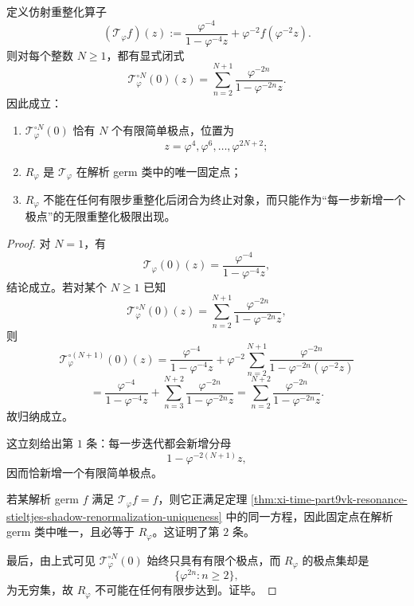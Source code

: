 \begin{corollary}[共振影子的有限步极点生成律]\label{cor:xi-time-part9vk-resonance-shadow-finite-step-pole-generation}
定义仿射重整化算子
\[
(\mathscr T_\varphi f)(z):=
\frac{\varphi^{-4}}{1-\varphi^{-4}z}
+\varphi^{-2}f(\varphi^{-2}z).
\]
则对每个整数 \(N\ge 1\)，都有显式闭式
\[
\mathscr T_\varphi^{\circ N}(0)(z)
=
\sum_{n=2}^{N+1}\frac{\varphi^{-2n}}{1-\varphi^{-2n}z}.
\]
因此成立：
\begin{enumerate}
  \item \(\mathscr T_\varphi^{\circ N}(0)\) 恰有 \(N\) 个有限简单极点，位置为
  \[
  z=\varphi^4,\varphi^6,\dots,\varphi^{2N+2};
  \]
  \item \(R_\varphi\) 是 \(\mathscr T_\varphi\) 在解析 germ 类中的唯一固定点；
  \item \(R_\varphi\) 不能在任何有限步重整化后闭合为终止对象，而只能作为“每一步新增一个极点”的无限重整化极限出现。
\end{enumerate}
\end{corollary}
\begin{proof}
对 \(N=1\)，有
\[
\mathscr T_\varphi(0)(z)=\frac{\varphi^{-4}}{1-\varphi^{-4}z},
\]
结论成立。若对某个 \(N\ge 1\) 已知
\[
\mathscr T_\varphi^{\circ N}(0)(z)
=
\sum_{n=2}^{N+1}\frac{\varphi^{-2n}}{1-\varphi^{-2n}z},
\]
则
\[
\mathscr T_\varphi^{\circ(N+1)}(0)(z)
=
\frac{\varphi^{-4}}{1-\varphi^{-4}z}
+\varphi^{-2}\sum_{n=2}^{N+1}
\frac{\varphi^{-2n}}{1-\varphi^{-2n}(\varphi^{-2}z)}
\]
\[
=
\frac{\varphi^{-4}}{1-\varphi^{-4}z}
+\sum_{n=3}^{N+2}\frac{\varphi^{-2n}}{1-\varphi^{-2n}z}
=
\sum_{n=2}^{N+2}\frac{\varphi^{-2n}}{1-\varphi^{-2n}z}.
\]
故归纳成立。

这立刻给出第 \(1\) 条：每一步迭代都会新增分母
\[
1-\varphi^{-2(N+1)}z,
\]
因而恰新增一个有限简单极点。

若某解析 germ \(f\) 满足 \(\mathscr T_\varphi f=f\)，则它正满足定理
\ref{thm:xi-time-part9vk-resonance-stieltjes-shadow-renormalization-uniqueness}
中的同一方程，因此固定点在解析 germ 类中唯一，且必等于 \(R_\varphi\)。这证明了第 \(2\) 条。

最后，由上式可见 \(\mathscr T_\varphi^{\circ N}(0)\) 始终只具有有限个极点，而 \(R_\varphi\) 的极点集却是
\[
\{\varphi^{2n}:n\ge 2\},
\]
为无穷集，故 \(R_\varphi\) 不可能在任何有限步达到。证毕。
\end{proof}

